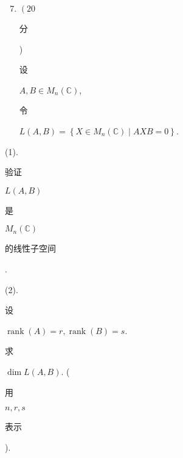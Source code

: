 \documentclass[10pt]{article}
\begin{document}
\begin{enumerate}
  \setcounter{enumi}{6}
  \item $\left(20\right.$ \begin{CJK}{UTF8}{mj}分\end{CJK}) \begin{CJK}{UTF8}{mj}设\end{CJK} $A, B \in M_{n}(\mathbb{C})$, \begin{CJK}{UTF8}{mj}令\end{CJK} $L(A, B)=\left\{X \in M_{n}(\mathbb{C}) \mid A X B=0\right\}$.
\end{enumerate}
(1). \begin{CJK}{UTF8}{mj}验证\end{CJK} $L(A, B)$ \begin{CJK}{UTF8}{mj}是\end{CJK} $M_{n}(\mathbb{C})$ \begin{CJK}{UTF8}{mj}的线性子空间\end{CJK}.

(2). \begin{CJK}{UTF8}{mj}设\end{CJK} $\operatorname{rank}(A)=r, \operatorname{rank}(B)=s$. \begin{CJK}{UTF8}{mj}求\end{CJK} $\operatorname{dim} L(A, B)$. (\begin{CJK}{UTF8}{mj}用\end{CJK} $n, r, s$ \begin{CJK}{UTF8}{mj}表示\end{CJK}).
\end{document}

